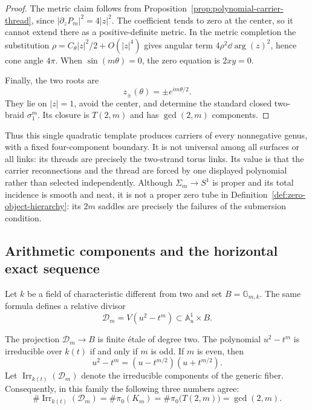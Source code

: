 \begin{proof}
The metric claim follows from Proposition~\ref{prop:polynomial-carrier-thread},
since $|\partial_zP_m|^2=4|z|^2$.  The coefficient tends to zero at the center,
so it cannot extend there as a positive-definite metric.  In the metric
completion the substitution $\rho=C_\theta |z|^2/2+O(|z|^4)$ gives angular
term $4\rho^2\dd\arg(z)^2$, hence cone angle $4\pi$.  When
$\sin(m\theta)=0$, the zero equation is $2xy=0$.

Finally, the two roots are
\begin{equation}
 z_\pm(\theta)=\pm e^{im\theta/2}.
 \label{eq:quadratic-carrier-roots}
\end{equation}
They lie on $|z|=1$, avoid the center, and determine the standard closed
two-braid $\sigma_1^m$.  Its closure is $T(2,m)$ and has
$\gcd(2,m)$ components.
\end{proof}

Thus this single quadratic template produces carriers of every nonnegative
genus, with a fixed four-component boundary.  It is not universal among all
surfaces or all links: its threads are precisely the two-strand torus links.
Its value is that the carrier reconnections and the thread are forced by one
displayed polynomial rather than selected independently.
Although $\Sigma_m\to S^1$ is proper and its total incidence is smooth and
neat, it is not a proper zero tube in Definition~\ref{def:zero-object-hierarchy}:
its $2m$ saddles are precisely the failures of the submersion condition.

\subsection{Arithmetic components and the horizontal exact sequence}

Let $k$ be a field of characteristic different from two and set
$B=\mathbb G_{m,k}$.  The same formula defines a relative divisor
\begin{equation}
 \mathcal D_m
 =V(u^2-t^m)\subset\mathbb A^1_u\times B.
 \label{eq:quadratic-carrier-relative-divisor}
\end{equation}

\begin{proposition}
\label{prop:quadratic-thread-arithmetic-components}
The projection $\mathcal D_m\to B$ is finite \'etale of degree two.  The polynomial
$u^2-t^m$ is irreducible over $k(t)$ if and only if $m$ is odd.  If $m$ is even,
then
\begin{equation}
 u^2-t^m=(u-t^{m/2})(u+t^{m/2}).
 \label{eq:quadratic-thread-factorization}
\end{equation}
Let $\operatorname{Irr}_{k(t)}(\mathcal D_m)$ denote the irreducible components
of the generic fiber.  Consequently, in this family the following three numbers
agree:
\begin{equation}
 \#\operatorname{Irr}_{k(t)}(\mathcal D_m)
 =\#\pi_0(K_m)
 =\#\pi_0\bigl(T(2,m)\bigr)
 =\gcd(2,m).
 \label{eq:quadratic-thread-component-identity}
\end{equation}
\end{proposition}

